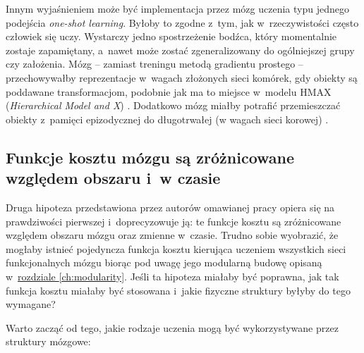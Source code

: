 Innym wyjaśnieniem może być implementacja przez mózg uczenia typu jednego podejścia \emph{one-shot learning}.
Byłoby to zgodne z~tym, jak w~rzeczywistości często człowiek się uczy.
Wystarczy jedno spostrzeżenie bodźca, który momentalnie zostaje zapamiętany, a~nawet może zostać zgeneralizowany do ogólniejszej grupy czy założenia.
Mózg -- zamiast treningu metodą gradientu prostego -- przechowywałby reprezentacje w~wagach złożonych sieci komórek, gdy obiekty są poddawane transformacjom, podobnie jak ma to miejsce w~modelu HMAX (\emph{Hierarchical Model and X}) \cite{serre2007feedforward}.
Dodatkowo mózg miałby potrafić przemieszczać obiekty z~pamięci epizodycznej do długotrwałej (w wagach sieci korowej) \cite{ji2007coordinated}.

\subsection{Funkcje kosztu mózgu są zróżnicowane względem obszaru i~w czasie}
\label{subsec:cost-function-is-diverse}

Druga hipoteza przedstawiona przez autorów omawianej pracy \cite{marblestone2016toward} opiera się na prawdziwości pierwszej i~doprecyzowuje ją: te funkcje kosztu są zróżnicowane względem obszaru mózgu oraz zmienne w~czasie.
Trudno sobie wyobrazić, że mogłaby istnieć pojedyncza funkcja kosztu kierująca uczeniem wszystkich sieci funkcjonalnych mózgu biorąc pod uwagę jego modularną budowę opisaną w~\hyperref[ch:modularity]{rozdziale \ref*{ch:modularity}}.
Jeśli  ta hipoteza miałaby być poprawna, jak tak funkcja kosztu miałaby być stosowana i~jakie fizyczne struktury byłyby do tego wymagane?

Warto zacząć od tego, jakie rodzaje uczenia mogą być wykorzystywane przez struktury mózgowe:

